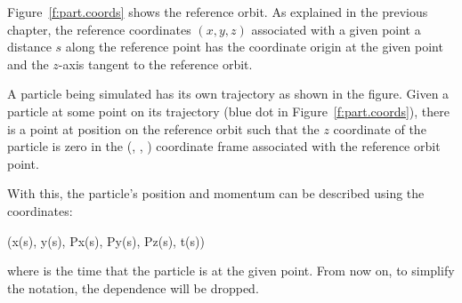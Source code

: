 \documentclass{hitec}     %
\begin{document}
{Figure~\ref{f:part.coords} shows the reference orbit. As explained in the previous chapter, the
reference coordinates $(x, y, z)$ associated with a given point a distance $s$ along the reference
point has the coordinate origin at the given point and the $z$-axis tangent to the reference orbit.

A particle being simulated has its own trajectory as shown in the figure. Given a particle at some
point on its trajectory (blue dot in Figure~\ref{f:part.coords}), there is a point at position
 on the reference orbit such that the $z$ coordinate of the particle is zero in the (,
, ) coordinate frame associated with the reference orbit point.

With this, the particle's position and momentum  can be described using the coordinates:
\begin{code}
    (x(s), y(s), Px(s), Py(s), Pz(s), t(s))
\end{code}
where  is the time that the particle is at the given point. From now on, to simplify the
notation, the  dependence will be dropped.

}
\end{document}
